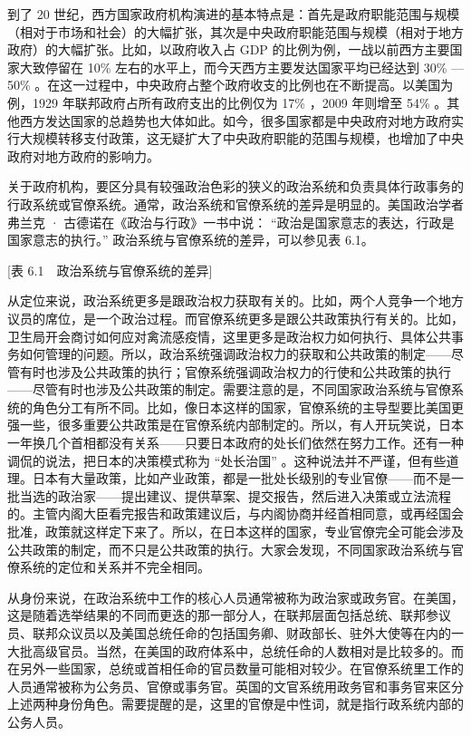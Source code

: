 到了 20 世纪，西方国家政府机构演进的基本特点是：首先是政府职能范围与规模（相对于市场和社会）的大幅扩张，其次是中央政府职能范围与规模（相对于地方政府）的大幅扩张。比如，以政府收入占 GDP 的比例为例，一战以前西方主要国家大致停留在 10\% 左右的水平上，而今天西方主要发达国家平均已经达到 30\% —50\% 。在这一过程中，中央政府占整个政府收支的比例也在不断提高。以美国为例，1929 年联邦政府占所有政府支出的比例仅为 17\% ，2009 年则增至 54\% 。其他西方发达国家的总趋势也大体如此。如今，很多国家都是中央政府对地方政府实行大规模转移支付政策，这无疑扩大了中央政府职能的范围与规模，也增加了中央政府对地方政府的影响力。


关于政府机构，要区分具有较强政治色彩的狭义的政治系统和负责具体行政事务的行政系统或官僚系统。通常，政治系统和官僚系统的差异是明显的。美国政治学者弗兰克 · 古德诺在《政治与行政》一书中说： “政治是国家意志的表达，行政是国家意志的执行。” 政治系统与官僚系统的差异，可以参见表 6.1。

[表 6.1　政治系统与官僚系统的差异]

从定位来说，政治系统更多是跟政治权力获取有关的。比如，两个人竞争一个地方议员的席位，是一个政治过程。而官僚系统更多是跟公共政策执行有关的。比如，卫生局开会商讨如何应对禽流感疫情，这里更多是政治权力如何执行、具体公共事务如何管理的问题。所以，政治系统强调政治权力的获取和公共政策的制定——尽管有时也涉及公共政策的执行；官僚系统强调政治权力的行使和公共政策的执行——尽管有时也涉及公共政策的制定。需要注意的是，不同国家政治系统与官僚系统的角色分工有所不同。比如，像日本这样的国家，官僚系统的主导型要比美国更强一些，很多重要公共政策是在官僚系统内部制定的。所以，有人开玩笑说，日本一年换几个首相都没有关系——只要日本政府的处长们依然在努力工作。还有一种调侃的说法，把日本的决策模式称为 “处长治国” 。这种说法并不严谨，但有些道理。日本有大量政策，比如产业政策，都是一批处长级别的专业官僚——而不是一批当选的政治家——提出建议、提供草案、提交报告，然后进入决策或立法流程的。主管内阁大臣看完报告和政策建议后，与内阁协商并经首相同意，或再经国会批准，政策就这样定下来了。所以，在日本这样的国家，专业官僚完全可能会涉及公共政策的制定，而不只是公共政策的执行。大家会发现，不同国家政治系统与官僚系统的定位和关系并不完全相同。

从身份来说，在政治系统中工作的核心人员通常被称为政治家或政务官。在美国，这是随着选举结果的不同而更迭的那一部分人，在联邦层面包括总统、联邦参议员、联邦众议员以及美国总统任命的包括国务卿、财政部长、驻外大使等在内的一大批高级官员。当然，在美国的政府体系中，总统任命的人数相对是比较多的。而在另外一些国家，总统或首相任命的官员数量可能相对较少。在官僚系统里工作的人员通常被称为公务员、官僚或事务官。英国的文官系统用政务官和事务官来区分上述两种身份角色。需要提醒的是，这里的官僚是中性词，就是指行政系统内部的公务人员。

